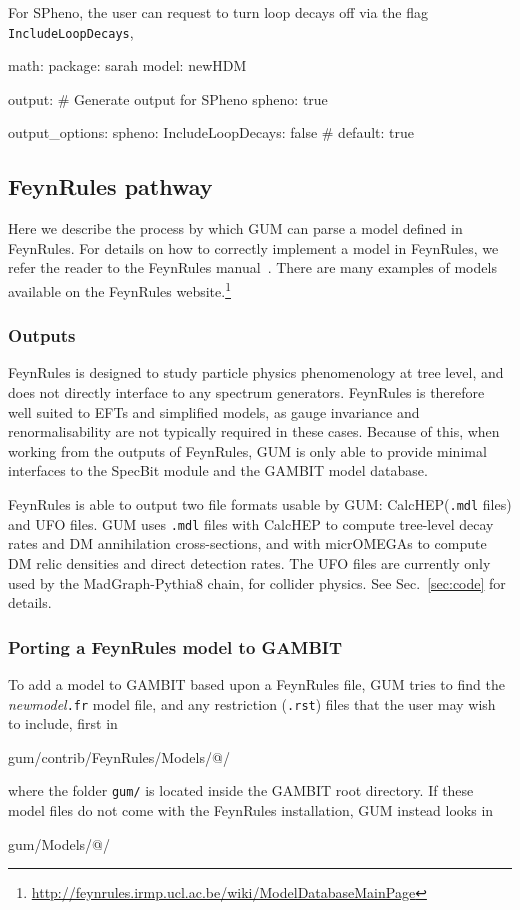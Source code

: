 \documentclass[pdftex,twocolumn,epjc3_preprint,runningheads]{svjour3}
\renewcommand{\_}{\discretionary{\underscore}{}{\underscore}}
\newcommand\term[1]{{\lstset{style=terminal}\lstinline!#1!\lstset{style=cpp}}}
\newcommand\guminline[1]{{{\lstset{style=gum}\lstinline!#1!}}}
\newcommand{\metavarf}[1]{\textit{\color{darkgreen}\footnotesize\textrm{#1}}}
\newcommand{\metavar}{\metavarf}
\newcommand{\gambit}{\textsf{GAMBIT}\xspace}
\newcommand{\specbit}{\textsf{SpecBit}\xspace}
\newcommand{\GB}{\gambit}
\newcommand{\pythia}{\textsf{Pythia}\xspace}
\newcommand{\mo}{\micromegas}
\newcommand{\micromegas}{\textsf{micrOMEGAs}\xspace}
\newcommand{\gum}{\textsf{GUM}\xspace}
\newcommand{\fr}{\textsf{FeynRules}\xspace}
\newcommand{\CH}{\textsf{CalcHEP}\xspace}
\newcommand{\MG}{\textsf{MadGraph}\xspace}
\newcommand{\ufo}{\textsf{UFO}\xspace}
\newcommand{\spheno}{\textsf{SPheno}\xspace}
\newcommand{\nm}{\metavar{new\_model}}
\begin{document}
For \spheno, the user can request to turn loop decays off via the flag \guminline{IncludeLoopDecays},
%
\begin{lstgum}
math:
  package: sarah
  model: newHDM

output:
  # Generate output for SPheno
  spheno: true

output_options:
  spheno:
    IncludeLoopDecays: false # default: true
\end{lstgum}

\subsection{\fr pathway} \label{sec:feynrules}

Here we describe the process by which \gum can parse a model defined in \fr. For details on how to correctly implement a model in \fr, we refer the reader to the \fr manual~\cite{Alloul:2013bka}. There are many examples of models available on the \fr website.\footnote{\url{http://feynrules.irmp.ucl.ac.be/wiki/ModelDatabaseMainPage}}

\subsubsection{Outputs}

\fr is designed to study particle physics phenomenology at tree level, and does not directly interface to any spectrum generators. \fr is therefore well suited to EFTs and simplified models, as gauge invariance and renormalisability are not typically required in these cases. Because of this, when working from the outputs of \fr, \gum is only able to provide minimal interfaces to the \specbit module and the \GB model database.

\fr is able to output two file formats usable by \gum: \CH (\term{.mdl} files) and \ufo files. \gum uses \term{.mdl} files with \CH to compute tree-level decay rates and DM annihilation cross-sections, and with \mo to compute DM relic densities and direct detection rates. The \ufo files are currently only used by the \MG-\pythia\textsf{8} chain, for collider physics. See Sec.~\ref{sec:code} for details.

\subsubsection{Porting a \fr model to \GB}

To add a model to \GB based upon a \fr file, \gum tries to find the \nm\term{.fr} model file, and any restriction (\term{.rst}) files that the user may wish to include, first in
%
\begin{lstterm}
gum/contrib/FeynRules/Models/@\nm@/
\end{lstterm}
where the folder \term{gum/} is located inside the \GB root directory. If these model files do not come with the \fr installation, \gum instead looks in
\begin{lstterm}
gum/Models/@\nm@/
\end{lstterm}
\end{document}
